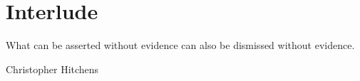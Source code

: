 \documentclass[./Thesis.tex]{subfiles}
\begin{document}
\chapter{Interlude}
\label{chap:interlude}

\epigraph{
  What can be asserted without evidence can also be dismissed without evidence.
}{Christopher Hitchens \cite{hitchens-quote}}
\end{document}
